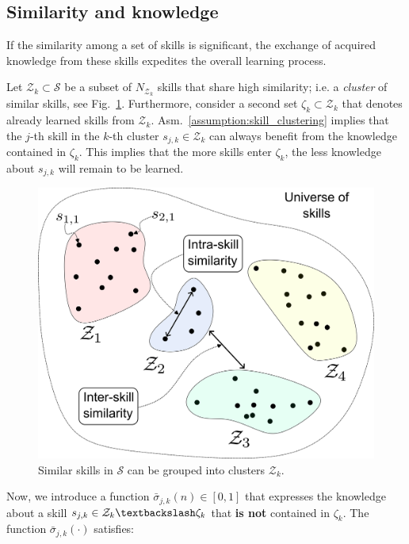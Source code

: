 \subsection{Similarity and knowledge}
\begin{tcolorbox}
	\begin{assumption}\label{assumption:skill_clustering} If the similarity among a set of skills is significant, the exchange of acquired knowledge from these skills expedites the overall learning process.
		\end{assumption}
\end{tcolorbox}
Let $\mathcal{Z}_k \subset \mathcal{S}$ be a subset of $N_{\mathcal{Z}_k}$ skills that share high similarity; i.e. a \emph{cluster} of similar skills, see Fig.~\ref{fig:skill_similarity}. Furthermore, consider a second set $\mathcal{\zeta}_k \subset \mathcal{Z}_k$ that denotes already learned skills from $\mathcal{Z}_k$. Asm.~\ref{assumption:skill_clustering} implies that the $j$-th skill in the $k$-th cluster $s_{j,k} \in \mathcal{Z}_k$ can always benefit from the knowledge contained in $\mathcal{\zeta}_k$. This implies that the more skills enter $\mathcal{\zeta}_k$, the less knowledge about $ s_{j,k} $ will remain to be learned.
\begin{figure}[!t]
	\centering
	\includegraphics[width=0.95\columnwidth]{fig/skill_similarity.png}
	\caption{Similar skills in $\mathcal{S}$ can be grouped into clusters $\mathcal{Z}_k$.}
	\label{fig:skill_similarity}
\end{figure}
Now, we introduce a function $\bar{\sigma}_{j,k}\left(n\right)\in [0,1]$ that expresses the knowledge about a skill $s_{j,k} \in \mathcal{Z}_k\textbackslash \mathcal{\zeta}_k$ that \textbf{is not} contained in $\mathcal{\zeta}_k$. The function $\bar{\sigma}_{j,k}(\cdot)$ satisfies:
